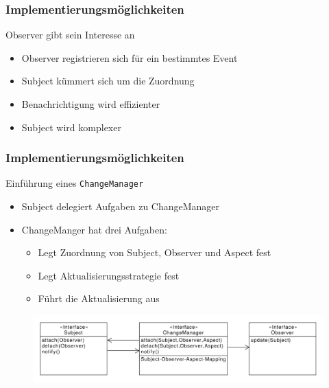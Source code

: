 \begin{frame}
\frametitle{Implementierungsmöglichkeiten}
		\begin{block}{Observer gibt sein Interesse an}
  		 \begin{itemize}
		  	\item Observer registrieren sich für ein bestimmtes Event
		  	\item Subject kümmert sich um die Zuordnung
		  	\item Benachrichtigung wird effizienter
		  	\item Subject wird komplexer
		  \end{itemize}  
  		\end{block}		
\end{frame}

\begin{frame}
\frametitle{Implementierungsmöglichkeiten}
		\begin{block}{Einführung eines \texttt{ChangeManager}}
  		 \begin{itemize}
		  	\item Subject delegiert Aufgaben zu ChangeManager
		  	\item ChangeManger hat drei Aufgaben:
		  	\begin{itemize}
		  		\item Legt Zuordnung von Subject, Observer und Aspect fest
		  		\item Legt Aktualisierungsstrategie fest
		  		\item Führt die Aktualisierung aus
		  	\end{itemize}
		  \end{itemize}  
  		\end{block}		
  		\begin{figure}
		\includegraphics[scale=.4]{paper/observer/changemanager}
	\end{figure}
\end{frame}

